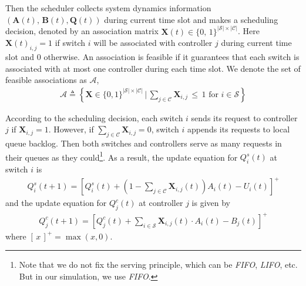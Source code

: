 \documentclass[10pt,journal,compsoc]{IEEEtran}
\begin{document}

Then the scheduler collects system dynamics information $\left( \mathbf{A}(t),\,\mathbf{B}(t), \mathbf{Q}(t) \right)$ during current time slot and makes a scheduling decision, denoted by an association matrix $\mathbf{X}(t) \in \{0,\,1\}^{|\mathcal{S}| \times |\mathcal{C}|}$. Here $\mathbf{X}(t)_{i,j} = 1$ if switch $i$ will be associated with controller $j$ during current time slot and $0$ otherwise. An association is feasible if it guarantees that each switch is associated with at most one controller during each time slot. We denote the set of feasible associations as $\mathcal{A}$,
\begin{equation}\label{constraint set}
	\begin{array}{c}
		\displaystyle	\mathcal{A} \triangleq \left\{ \mathbf{X} \in \{0,1\}^{|\mathcal{S}| \times |\mathcal{C}|}\,|\,\sum_{j \in \mathcal{C}} \mathbf{X}_{i,j} \, \le \, 1 \text{ for } i \in \mathcal{S} \right\}
	\end{array}
\end{equation}

According to the scheduling decision, each switch $i$ sends its request to controller $j$ if $\mathbf{X}_{i,j} = 1$. However, if $\sum_{j \in \mathcal{C}} \mathbf{X}_{i,j} = 0$, switch $i$ appends its requests to local queue backlog. Then both switches and controllers serve as many requests in their queues as they could\footnote{Note that we do not fix the serving principle, which can be \emph{FIFO}, \emph{LIFO}, etc. But in our simulation, we use \emph{FIFO}.}. 
As a result, the update equation for $Q^s_i(t)$ at switch $i$ is 
\begin{equation}\label{ueq for s}
\begin{array}{c}
	\displaystyle Q^s_i(t+1) = \left[ Q^s_i(t) + \left( 1 - \sum_{j \in \mathcal{C}} \mathbf{X}_{i,j}(t) \right) {A}_{i}(t) - U_i(t)\right]^{+}
\end{array}
\end{equation}
and the update equation for $Q^c_j(t)$ at controller $j$ is given by
\begin{equation}\label{ueq for c}
\begin{array}{c}
	\displaystyle Q^c_j(t+1) = \left[ Q^c_j(t) + \sum_{i \in \mathcal{S}} \mathbf{X}_{i,j}(t)\cdot {A}_{i}(t) - B_j(t)\right]^{+}
\end{array}
\end{equation}
where $\left[\,x\,\right]^{+} = \max(x,0)$. 
\end{document}
